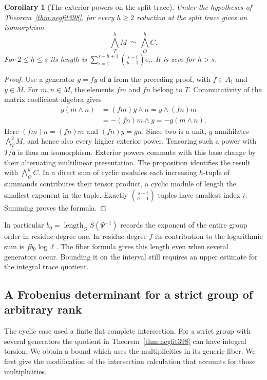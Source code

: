 \documentclass[a4paper,11pt]{article}
\newtheorem{corollary}[proposition]{Corollary}
\theoremstyle{definition}
\theoremstyle{remark}
\numberwithin{equation}{section}
\begin{document}
\begin{corollary}[The exterior powers on the split trace]\leavevmode
\label{cor:negwedge398}
Under the hypotheses of Theorem~\ref{thm:negfit398}, for every
\(h\ge2\) reduction at the split trace gives an isomorphism
\[
             \bigwedge_T^h M\ \simeq\ \bigwedge_O^h C .
\]
For \(2\le h\le s\) its length is
\(\sum_{i=1}^{s-h+1}\binom{s-i}{h-1}e_i\). It is zero for
\(h>s\).
\end{corollary}
\begin{proof}
Use a generator \(g=fy\) of \(\mathfrak a\) from the preceding
proof, with \(f\in A_1\) and \(y\in M\). For \(m,n\in M\),
the elements \(fm\) and \(fn\) belong to \(T\). Commutativity of
the matrix coefficient algebra gives
\[
 \begin{aligned}
  g(m\wedge n)&=(fm)y\wedge n
     =y\wedge (fn)m\\
     &=-(fn)m\wedge y=-g(m\wedge n).
 \end{aligned}
\]
Here \((fm)n=(fn)m\) and \((fn)y=gn\). Since two is a unit,
\(g\) annihilates \(\bigwedge_T^2 M\), and hence also every
higher exterior power. Tensoring such a power with \(T/\mathfrak a\)
is thus an isomorphism. Exterior powers commute with this base
change by their alternating multilinear presentation. The
proposition identifies the result with \(\bigwedge_O^h C\).
In a direct sum of cyclic modules each increasing \(h\)-tuple
of summands contributes their tensor product, a cyclic module of
length the smallest exponent in the tuple. Exactly
\(\binom{s-i}{h-1}\) tuples have smallest index \(i\). Summing
proves the formula.
\end{proof}

In particular \(b_0=\operatorname{length}_O S(\Psi^{-1})\)
records the exponent of the entire group order in residue degree
one. In residue degree \(f\) its contribution to the logarithmic
sum is \(f b_0\log\ell\). The fiber formula gives this length
even when several generators occur. Bounding it on the interval
still requires an upper estimate for the integral trace quotient.


\subsection{A Frobenius determinant for a strict group of arbitrary rank}
\label{sec:horizontalstrict399}

The cyclic case used a finite flat complete intersection. For a
strict group with several generators the quotient in
Theorem~\ref{thm:negfit398} can have integral torsion. We obtain a
bound which uses the multiplicities in its generic fiber. We first
give the modification of the intersection calculation that accounts
for those multiplicities.
\end{document}
